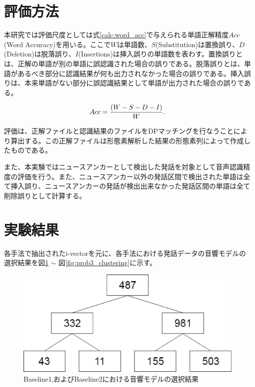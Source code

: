 \section{評価方法}
本研究では評価尺度としては式\ref{calc:word_acc}で与えられる単語正解精度$Acc$(Word Accuracy)を用いる。ここで$W$は単語数、$S$(Substitution)は置換誤り、$D$(Deletion)は脱落誤り、$I$(Insertions)は挿入誤りの単語数を表わす。置換誤りとは、正解の単語が別の単語に誤認識された場合の誤りである。脱落誤りとは、単語があるべき部分に認識結果が何も出力されなかった場合の誤りである。挿入誤りは、本来単語がない部分に誤認識結果として単語が出力された場合の誤りである。

\begin{equation}
\label{calc:word_acc}
Acc=\frac{(W-S-D-I)}{W}. \notag
\end{equation}

          
評価は、正解ファイルと認識結果のファイルをDPマッチングを行なうことにより算出する。この正解ファイルは形態素解析した結果の形態素列によって作成したものである。


また、本実験ではニュースアンカーとして検出した発話を対象として音声認識精度の評価を行う。また、ニュースアンカー以外の発話区間で検出された単語は全て挿入誤り、ニュースアンカーの発話が検出出来なかった発話区間の単語は全て削除誤りとして計算する。

\section{実験結果}
各手法で抽出されたi-vectorを元に、各手法における発話データの音響モデルの選択結果を図\ref{fig:baseline_clustering} $\sim$ 図\ref{fig:prob3_clustering}に示す。

\begin{figure}[H]
  \begin{center}
    \includegraphics[scale=0.5]{./figure/baseline_clustering.eps}
  \end{center}
  \caption{Baseline1,およびBaseline2における音響モデルの選択結果 \label{fig:baseline_clustering}}
\end{figure}

